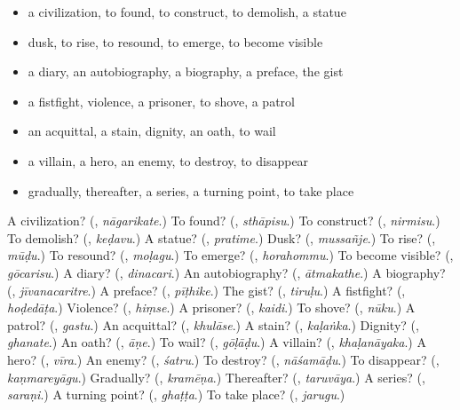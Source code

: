 \begin{itemize}
\raggedright
  \item a civilization, to found, to construct, to demolish, a statue
  \item dusk, to rise, to resound, to emerge, to become visible
  \item a diary, an autobiography, a biography, a preface, the gist
  \item a fistfight, violence, a prisoner, to shove, a patrol
  \item an acquittal, a stain, dignity, an oath, to wail
  \item a villain, a hero, an enemy, to destroy, to disappear
  \item gradually, thereafter, a series, a turning point, to take place
\end{itemize}

\begin{tcolorbox}[breakable,colback=teal!4,colframe=teal!35!black,title={Before you move on}]
A civilization? (\textbf{}, \emph{nāgarikate}.) To found? (\textbf{}, \emph{sthāpisu}.) To construct? (\textbf{}, \emph{nirmisu}.) To demolish? (\textbf{}, \emph{keḍavu}.) A statue? (\textbf{}, \emph{pratime}.) Dusk? (\textbf{}, \emph{mussañje}.) To rise? (\textbf{}, \emph{mūḍu}.) To resound? (\textbf{}, \emph{moḷagu}.) To emerge? (\textbf{}, \emph{horahommu}.) To become visible? (\textbf{}, \emph{gōcarisu}.) A diary? (\textbf{}, \emph{dinacari}.) An autobiography? (\textbf{}, \emph{ātmakathe}.) A biography? (\textbf{}, \emph{jīvanacaritre}.) A preface? (\textbf{}, \emph{pīṭhike}.) The gist? (\textbf{}, \emph{tiruḷu}.) A fistfight? (\textbf{}, \emph{hoḍedāṭa}.) Violence? (\textbf{}, \emph{hiṃse}.) A prisoner? (\textbf{}, \emph{kaidi}.) To shove? (\textbf{}, \emph{nūku}.) A patrol? (\textbf{}, \emph{gastu}.) An acquittal? (\textbf{}, \emph{khulāse}.) A stain? (\textbf{}, \emph{kaḷaṅka}.) Dignity? (\textbf{}, \emph{ghanate}.) An oath? (\textbf{}, \emph{āṇe}.) To wail? (\textbf{}, \emph{gōḷāḍu}.) A villain? (\textbf{}, \emph{khaḷanāyaka}.) A hero? (\textbf{}, \emph{vīra}.) An enemy? (\textbf{}, \emph{śatru}.) To destroy? (\textbf{}, \emph{nāśamāḍu}.) To disappear? (\textbf{}, \emph{kaṇmareyāgu}.) Gradually? (\textbf{}, \emph{kramēṇa}.) Thereafter? (\textbf{}, \emph{taruvāya}.) A series? (\textbf{}, \emph{saraṇi}.) A turning point? (\textbf{}, \emph{ghaṭṭa}.) To take place? (\textbf{}, \emph{jarugu}.)
\end{tcolorbox}
